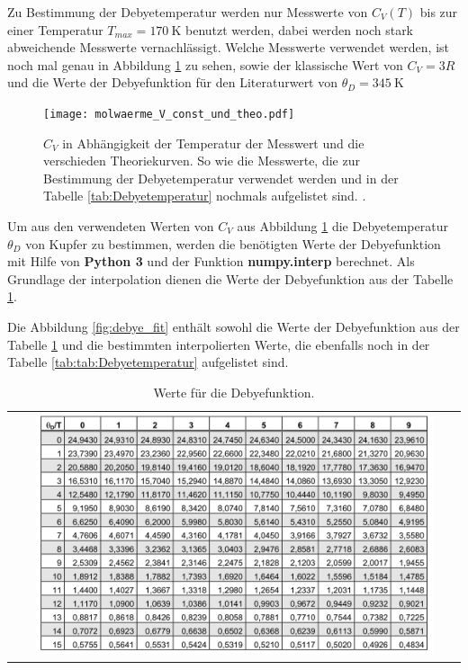Zu Bestimmung der Debyetemperatur werden nur Messwerte von $C_V(T)$ bis zur einer Temperatur $T_{max}=\SI{170}{\kelvin} $ benutzt werden, dabei werden noch stark abweichende Messwerte vernachlässigt.
Welche Messwerte verwendet werden, ist noch mal genau in Abbildung \ref{fig:cool} zu sehen, sowie
der klassische Wert von $C_V=3R$ und die Werte der Debyefunktion
für den Literaturwert von $\theta_D = \SI{345}{\kelvin}$  \cite{debyetemp}


\begin{figure}
 \centering
 \texttt{[image: molwaerme\_V\_const\_und\_theo.pdf]}
   \caption{ $C_V$ in Abhängigkeit der Temperatur
    der Messwert und die verschieden
    Theoriekurven. So wie die Messwerte,
   die zur Bestimmung der Debyetemperatur
    verwendet werden und in der
    Tabelle \ref{tab:Debyetemperatur}
    nochmals aufgelistet sind.
.}
   \label{fig:cool}
 \end{figure}

 Um aus den verwendeten Werten von $C_V$ aus
Abbildung \ref{fig:cool} die Debyetemperatur
 $\theta_D$ von Kupfer zu bestimmen,
werden die benötigten Werte der Debyefunktion
mit Hilfe von \textbf{Python 3} und der
Funktion \textbf{numpy.interp} \cite{interp}
berechnet. Als Grundlage der interpolation
dienen die Werte der Debyefunktion aus der
Tabelle \ref{fig:debye}.

Die Abbildung \ref{fig:debye_fit} enthält sowohl
die Werte der Debyefunktion
aus der Tabelle \ref{fig:debye} und die bestimmten
interpolierten Werte, die ebenfalls noch in der Tabelle
\ref{tab:tab:Debyetemperatur} aufgelistet sind.

 \begin{table}
  \centering
  \caption{Werte für die Debyefunktion.}
  \label{fig:debye}
\begin{tabular}{c}
  \includegraphics[width=0.9\textwidth]{Debye.PNG}
\end{tabular}
\end{table}


